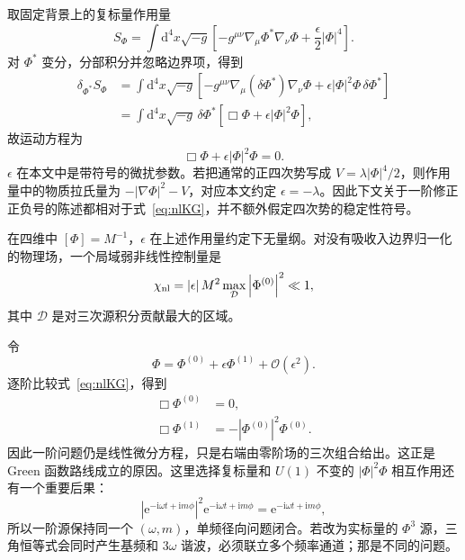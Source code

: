 \documentclass[UTF8,fontset=fandol,11pt,a4paper,oneside]{ctexart}
\numberwithin{equation}{section}
\newcommand{\dd}{\mathrm d}
\newcommand{\ii}{\mathrm i}
\newcommand{\ee}{\mathrm e}
\newcommand{\cO}{\mathcal O}
\newcommand{\abs}[1]{\left|#1\right|}
\begin{document}
取固定背景上的复标量作用量
\begin{equation}
S_\Phi=\int \dd^4x\sqrt{-g}\left[
-g^{\mu\nu}\nabla_\mu\Phi^*\nabla_\nu\Phi
+\frac{\epsilon}{2}\abs{\Phi}^4\right].
\label{eq:action}
\end{equation}
对 $\Phi^*$ 变分，分部积分并忽略边界项，得到
\begin{align}
\delta_{\Phi^*}S_\Phi
&=\int\dd^4x\sqrt{-g}\left[
-g^{\mu\nu}\nabla_\mu(\delta\Phi^*)\nabla_\nu\Phi
+\epsilon\abs{\Phi}^2\Phi\,\delta\Phi^*\right]\nonumber\\
&=\int\dd^4x\sqrt{-g}\,\delta\Phi^*
\left[\Box\Phi+\epsilon\abs{\Phi}^2\Phi\right],
\end{align}
故运动方程为
\begin{equation}
\boxed{\Box\Phi+\epsilon\abs{\Phi}^2\Phi=0.}
\label{eq:nlKG}
\end{equation}
$\epsilon$ 在本文中是带符号的微扰参数。若把通常的正四次势写成 $V=\lambda\abs{\Phi}^4/2$，则作用量中的物质拉氏量为 $-\abs{\nabla\Phi}^2-V$，对应本文约定 $\epsilon=-\lambda$。因此下文关于一阶修正正负号的陈述都相对于式~\eqref{eq:nlKG}，并不额外假定四次势的稳定性符号。

在四维中 $[\Phi]=M^{-1}$，$\epsilon$ 在上述作用量约定下无量纲。对没有吸收入边界归一化的物理场，一个局域弱非线性控制量是
\begin{equation}
\chi_{\rm nl}=\abs{\epsilon}M^2
\max_{\mathcal D}\abs{\Phi^{(0)}}^2\ll1,
\label{eq:chi}
\end{equation}
其中 $\mathcal D$ 是对三次源积分贡献最大的区域。

令
\begin{equation}
\Phi=\Phi^{(0)}+\epsilon\Phi^{(1)}+\cO(\epsilon^2).
\end{equation}
逐阶比较式~\eqref{eq:nlKG}，得到
\begin{align}
\Box\Phi^{(0)}&=0,\label{eq:order0}\\
\Box\Phi^{(1)}&=-\abs{\Phi^{(0)}}^2\Phi^{(0)}.
\label{eq:order1}
\end{align}
因此一阶问题仍是线性微分方程，只是右端由零阶场的三次组合给出。这正是 Green 函数路线成立的原因。这里选择复标量和 $U(1)$ 不变的 $\abs\Phi^2\Phi$ 相互作用还有一个重要后果：
\begin{equation}
\abs{\ee^{-\ii\omega t+\ii m\phi}}^2
\ee^{-\ii\omega t+\ii m\phi}
=\ee^{-\ii\omega t+\ii m\phi},
\end{equation}
所以一阶源保持同一个 $(\omega,\allowbreak m)$，单频径向问题闭合。若改为实标量的 $\Phi^3$ 源，三角恒等式会同时产生基频和 $3\omega$ 谐波，必须联立多个频率通道；那是不同的问题。
\end{document}
